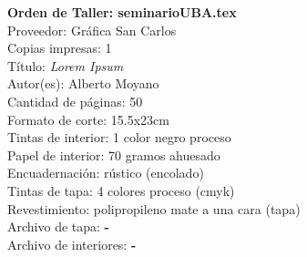 \documentclass[11pt]{article}
\newcommand\titulo[1]{\sf\Large{\textbf{#1}}}
\newcommand\subtitulo[1]{\sf\large{#1}}
\begin{document}
\thispagestyle{empty}
\noindent \titulo{Orden de Taller: seminarioUBA.tex}\\

\noindent \subtitulo{Proveedor: Gráfica San Carlos}\\
\noindent \subtitulo{Copias impresas: 1}\\

\noindent \subtitulo{Título: \emph{Lorem Ipsum}}\\
\noindent \subtitulo{Autor(es): Alberto Moyano}\\
\noindent \subtitulo{Cantidad de páginas: 50}\\
\noindent \subtitulo{Formato de corte: 15.5x23cm}\\
\noindent \subtitulo{Tintas de interior: 1 color negro proceso}\\
\noindent \subtitulo{Papel de interior: 70 gramos ahuesado}\\
\noindent \subtitulo{Encuadernación: rústico (encolado)}\\
\noindent \subtitulo{Tintas de tapa: 4 colores proceso (cmyk)}\\
\noindent \subtitulo{Revestimiento: polipropileno mate a una cara (tapa)}\\
\noindent \subtitulo{Archivo de tapa: \textbf{-}}\\
\noindent \subtitulo{Archivo de interiores: \textbf{-}}\\
\end{document}
